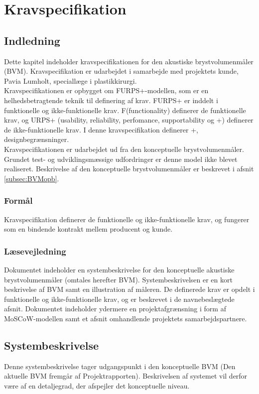 
\chapter{Kravspecifikation}
\label{chap:kravspec}
	\section{Indledning}
	Dette kapitel indeholder kravspecifikationen for den akustiske brystvolumenmåler (BVM). Kravspecifikation er udarbejdet i samarbejde med projektets kunde, Pavia Lumholt, speciallæge i plastikkirurgi. \\
	Kravspecifikationen er opbygget om FURPS+-modellen, som er en helhedsbetragtende teknik til definering af krav.
	FURPS+ er inddelt i funktionelle og ikke-funktionelle krav. F(functionality) definerer de funktionelle krav, og URPS+ (usability, reliability, perfomance, supportability og +) definerer de ikke-funktionelle krav. I denne kravspecifikation definerer +, designbegrænsninger.  \\
Kravspecifikationen er udarbejdet ud fra den konceptuelle brystvolumenmåler. Grundet test- og udviklingsmæssige udfordringer er denne model ikke blevet realiseret. Beskrivelse af den konceptuelle brystvolumenmåler er beskrevet i afsnit \ref{subsec:BVMopb}.
		  
		\subsection{Formål}
		Kravspecifikation definerer de funktionelle og ikke-funktionelle krav, og fungerer som en bindende kontrakt mellem producent og kunde.
	
		\subsection{Læsevejledning}	
		Dokumentet indeholder en systembeskrivelse for den konceptuelle akustiske brystvolumenmåler (omtales herefter BVM). Systembeskrivelsen er en kort beskrivelse af BVM samt en illustration af måleren. De definerede krav er opdelt i funktionelle og ikke-funktionelle krav, og er beskrevet i de navnebeslægtede afsnit. Dokumentet indeholder ydermere en projektafgrænsning i form af MoSCoW-modellen samt et afsnit omhandlende projektets samarbejdspartnere.
		
		\newpage
				
	\section{Systembeskrivelse}
Denne systembeskrivelse tager udgangspunkt i den konceptuelle BVM (Den aktuelle BVM fremgår af Projektrapporten). Beskrivelsen af systemet vil derfor være af en detaljegrad, der afspejler det konceptuelle niveau.

